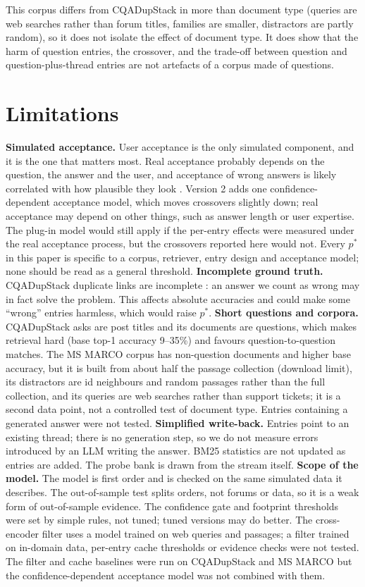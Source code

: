 \documentclass[11pt]{article}
\begin{document}
This corpus differs from CQADupStack in more than document type (queries are web searches rather than forum titles, families are smaller, distractors are partly random), so it does not isolate the effect of document type. It does show that the harm of question entries, the crossover, and the trade-off between question and question-plus-thread entries are not artefacts of a corpus made of questions.

\section{Limitations}
\textbf{Simulated acceptance.} User acceptance is the only simulated component, and it is the one that matters most. Real acceptance probably depends on the question, the answer and the user, and acceptance of wrong answers is likely correlated with how plausible they look \citep{joachims2007evaluating}. Version 2 adds one confidence-dependent acceptance model, which moves crossovers slightly down; real acceptance may depend on other things, such as answer length or user expertise. The plug-in model would still apply if the per-entry effects were measured under the real acceptance process, but the crossovers reported here would not. Every $p^*$ in this paper is specific to a corpus, retriever, entry design and acceptance model; none should be read as a general threshold.
\textbf{Incomplete ground truth.} CQADupStack duplicate links are incomplete \citep{hoogeveen2015cqadupstack}: an answer we count as wrong may in fact solve the problem. This affects absolute accuracies and could make some ``wrong'' entries harmless, which would raise $p^*$.
\textbf{Short questions and corpora.} CQADupStack asks are post titles and its documents are questions, which makes retrieval hard (base top-1 accuracy 9--35\%) and favours question-to-question matches. The MS MARCO corpus has non-question documents and higher base accuracy, but it is built from about half the passage collection (download limit), its distractors are id neighbours and random passages rather than the full collection, and its queries are web searches rather than support tickets; it is a second data point, not a controlled test of document type. Entries containing a generated answer were not tested.
\textbf{Simplified write-back.} Entries point to an existing thread; there is no generation step, so we do not measure errors introduced by an LLM writing the answer. BM25 statistics are not updated as entries are added. The probe bank is drawn from the stream itself.
\textbf{Scope of the model.} The model is first order and is checked on the same simulated data it describes. The out-of-sample test splits orders, not forums or data, so it is a weak form of out-of-sample evidence. The confidence gate and footprint thresholds were set by simple rules, not tuned; tuned versions may do better. The cross-encoder filter uses a model trained on web queries and passages; a filter trained on in-domain data, per-entry cache thresholds \citep{schroeder2025vcache} or evidence checks \citep{shah2026grounded} were not tested. The filter and cache baselines were run on CQADupStack and MS MARCO but the confidence-dependent acceptance model was not combined with them.
\end{document}
